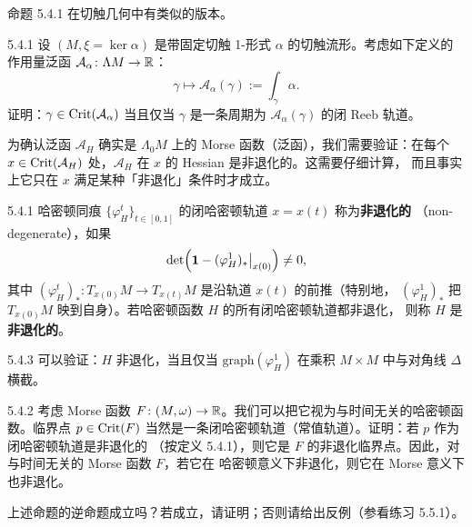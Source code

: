命题 5.4.1 在切触几何中有类似的版本。

\begin{wexer}{5.4.1}
  设 $(M,\xi=\ker\alpha)$ 是带固定切触 1-形式 $\alpha$ 的切触流形。考虑如下定义的作用量泛函
  $\mathcal{A}_\alpha\colon\Lambda M\to\mathbb{R}$：
  \[
    \gamma\mapsto\mathcal{A}_\alpha(\gamma):=\int_\gamma\alpha.
  \]
  证明：$\gamma\in\operatorname{Crit}(\mathcal{A}_\alpha)$ 当且仅当 $\gamma$ 是一条周期为
  $\mathcal{A}_\alpha(\gamma)$ 的闭 Reeb 轨道。
\end{wexer}

为确认泛函 $\mathcal{A}_H$ 确实是 $\Lambda_0M$ 上的 Morse 函数（泛函），我们需要验证：在每个
$x\in\operatorname{Crit}(\mathcal{A}_H)$ 处，$\mathcal{A}_H$ 在 $x$ 的 Hessian 是非退化的。这需要仔细计算，
而且事实上它只在 $x$ 满足某种「非退化」条件时才成立。

\begin{wdefn}{5.4.1}
  哈密顿同痕 $\{\varphi_H^t\}_{t\in[0,1]}$ 的闭哈密顿轨道 $x=x(t)$ 称为\textbf{非退化的}
  （non-degenerate），如果
  \[
    \det\Bigl(\mathbf{1}-(\varphi_H^1)_{*}\big|_{x(0)}\Bigr)\ne0,
  \]
  其中 $(\varphi_H^t)_{*}\colon T_{x(0)}M\to T_{x(t)}M$ 是沿轨道 $x(t)$ 的前推（特别地，
  $(\varphi_H^1)_{*}$ 把 $T_{x(0)}M$ 映到自身）。若哈密顿函数 $H$ 的所有闭哈密顿轨道都非退化，
  则称 $H$ 是\textbf{非退化的}。
\end{wdefn}

\begin{wrem}{5.4.3}
  可以验证：$H$ 非退化，当且仅当 $\mathrm{graph}(\varphi_H^1)$ 在乘积 $M\times M$ 中与对角线
  $\Delta$ 横截。
\end{wrem}

\begin{wexer}{5.4.2}
  考虑 Morse 函数 $F\colon(M,\omega)\to\mathbb{R}$。我们可以把它视为与时间无关的哈密顿函数。临界点
  $p\in\operatorname{Crit}(F)$ 当然是一条闭哈密顿轨道（常值轨道）。证明：若 $p$ 作为闭哈密顿轨道是非退化的
  （按定义 5.4.1），则它是 $F$ 的非退化临界点。因此，对与时间无关的 Morse 函数 $F$，若它在
  哈密顿意义下非退化，则它在 Morse 意义下也非退化。

  上述命题的逆命题成立吗？若成立，请证明；否则请给出反例（参看练习 5.5.1）。
\end{wexer}

